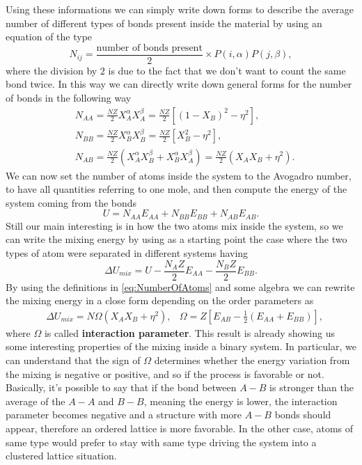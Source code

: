 Using these informations we can simply write down forms to describe the average number of different types of bonds present inside the material by using an equation of the type
\begin{equation}
    N_{ij} = \frac{\text{number of bonds present}}{2} \times P(i, \alpha) P(j, \beta),
\end{equation}
where the division by $2$ is due to the fact that we don't want to count the same bond twice. In this way we can directly write down general forms for the number of bonds in the following way
\begin{align}
    \label{eq:NumberOfAtoms}
    &N_{AA} = \frac{NZ}{2}X_A^\alpha X_A^\beta = \frac{NZ}{2}\left[ (1 - X_B)^2 - \eta^2 \right],\\
    &N_{BB} = \frac{NZ}{2}X_B^\alpha X_B^\beta = \frac{NZ}{2}\left[ X_B^2 - \eta^2 \right],\\
    &N_{AB} = \frac{NZ}{2}\left( X_A^\alpha X_B^\beta + X_B^\alpha X_A^\beta\right) = \frac{NZ}{2}\left( X_AX_B + \eta^2 \right).
\end{align}
We can now set the number of atoms inside the system to the Avogadro number, to have all quantities referring to one mole, and then compute the energy of the system coming from the bonds
\begin{equation}
    U = N_{AA} E_{AA} + N_{BB} E_{BB} + N_{AB} E_{AB}.
\end{equation}
Still our main interesting is in how the two atoms mix inside the system, so we can write the mixing energy by using as a starting point the case where the two types of atom were separated in different systems having
\begin{equation}
    \Delta U_{mix} = U - \frac{N_A Z}{2}E_{AA} - \frac{N_B Z}{2}E_{BB}.
\end{equation}
By using the definitions in \eqref{eq:NumberOfAtoms} and some algebra we can rewrite the mixing energy in a close form depending on the order parameters as
\begin{align}
    \label{eq:EnergyOfMixingBinary}
    &\Delta U_{mix} = N\Omega\left( X_AX_B + \eta^2 \right), &\Omega = Z\left[ E_{AB} - \frac{1}{2}\left(E_{AA} + E_{BB}\right) \right],
\end{align}
where $\Omega$ is called \textbf{interaction parameter}. This result is already showing us some interesting properties of the mixing inside a binary system. In particular, we can understand that the sign of $\Omega$ determines whether the energy variation from the mixing is negative or positive, and so if the process is favorable or not. Basically, it's possible to say that if the bond between $A-B$ is stronger than the average of the $A-A$ and $B-B$, meaning the energy is lower, the interaction parameter becomes negative and a structure with more $A-B$ bonds should appear, therefore an ordered lattice is more favorable. In the other case, atoms of same type would prefer to stay with same type driving the system into a clustered lattice situation.

